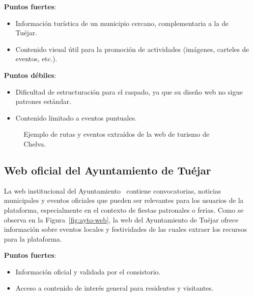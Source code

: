 \textbf{Puntos fuertes}:
\begin{itemize}
    \item Información turística de un municipio cercano, complementaria a la de Tuéjar.
    \item Contenido visual útil para la promoción de actividades (imágenes, carteles de eventos, etc.).
\end{itemize}

\textbf{Puntos débiles}:
\begin{itemize}
    \item Dificultad de estructuración para el raspado, ya que su diseño web no sigue patrones estándar.
    \item Contenido limitado a eventos puntuales.
\end{itemize}

\begin{figure}[h!tb]
    \centering
    \setlength{\fboxsep}{15pt}%
    \setlength{\fboxrule}{0.5pt}%
    \caption{Ejemplo de rutas y eventos extraídos de la web de turismo de Chelva.}
    \label{fig:chelva-web}
\end{figure}

\subsection{Web oficial del Ayuntamiento de Tuéjar}
La web institucional del Ayuntamiento~\cite{url.aytuejar} contiene convocatorias, noticias municipales y eventos oficiales que pueden ser relevantes para los usuarios de la plataforma, especialmente en el contexto de fiestas patronales o ferias. Como se observa en la Figura~\ref{fig:ayto-web}, la web del Ayuntamiento de Tuéjar ofrece información sobre eventos locales y festividades de las cuales extraer los recursos para la plataforma. 

\textbf{Puntos fuertes}:
\begin{itemize}
    \item Información oficial y validada por el consistorio.
    \item Acceso a contenido de interés general para residentes y visitantes.
\end{itemize}


